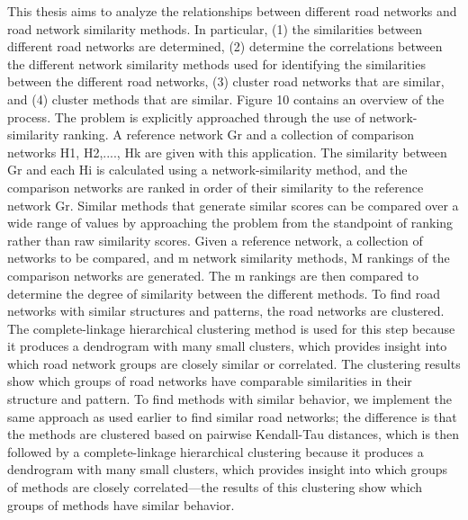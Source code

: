
This thesis aims to analyze the relationships between different road networks and road network similarity methods. In particular,  (1) the similarities between different road networks are determined, (2) determine the correlations between the different network similarity methods used for identifying the similarities between the different road networks, (3) cluster road networks that are similar, and (4) cluster methods that are similar. Figure 10 contains an overview of the process. The problem is explicitly approached through the use of network-similarity ranking. A reference network Gr and a collection of comparison networks H1, H2,...., Hk are given with this application. The similarity between Gr and each Hi is calculated using a network-similarity method, and the comparison networks are ranked in order of their similarity to the reference network Gr. Similar methods that generate similar scores can be compared over a wide range of values by approaching the problem from the standpoint of ranking rather than raw similarity scores. Given a reference network, a collection of networks to be compared, and m network similarity methods, M rankings of the comparison networks are generated. The m rankings are then compared to determine the degree of similarity between the different methods.
 To find road networks with similar structures and patterns, the road networks are clustered.
The complete-linkage hierarchical clustering method is used for this step because it produces a dendrogram with many small clusters, which provides insight into which road network groups are closely similar or correlated. The clustering results show which groups of road networks have comparable similarities in their structure and pattern. To find methods with similar behavior, we implement the same approach as used earlier to find similar road networks; the difference is that the methods are clustered based on pairwise Kendall-Tau distances, which is then followed by a complete-linkage hierarchical clustering because it produces a dendrogram with many small clusters, which provides insight into which groups of methods are closely correlated—the results of this clustering show which groups of methods have similar behavior.



